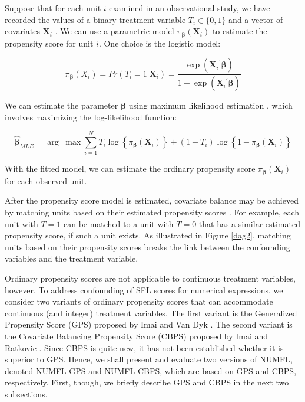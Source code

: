 Suppose that for each unit $i$ examined in an observational study, we have recorded the values of a binary treatment variable ${T_i} \in \{ 0,1\} $ and a vector of covariates ${\pmb{X}_i}$ .  We can use a parametric model ${\pi _{\pmb\beta} }({\pmb{X}_i})$ to estimate the propensity score for unit $i$.  One choice is the logistic model:

\begin{equation*}
{\pi _{\pmb\beta} }({X_i}) = Pr({T_i} = 1|{\pmb{X}_i}) = \frac{{\exp ({\pmb{X}_i}^\prime \pmb\beta )}}{{1 + \exp ({\pmb{X}_i}^\prime \pmb\beta )}}
\end{equation*}

We can estimate the parameter $\pmb\beta$ using maximum likelihood estimation \cite{Silvapulle1981}, which involves maximizing the log-likelihood function:

\begin{equation}\label{cp3:eq1}
{\pmb{\hat \beta} _{MLE}} = \arg \;\max \sum\limits_{i = 1}^N {{T_i}\log \left\{ {{\pi _{\pmb\beta} }({\pmb{X}_i})} \right\} + (1 - {T_i})} \log \left\{ {1 - {\pi _{\pmb\beta} }({\pmb{X}_i})} \right\}
\end{equation}

With the fitted model, we can estimate the ordinary propensity score  ${\pi _{\pmb\beta}}({\pmb{X}_i})$ for each observed unit.

After the propensity score model is estimated, covariate balance may be achieved by matching units based on their estimated propensity scores \cite{Rosenbaum1983}.  For example, each unit with $T=1$ can be matched to a unit with $T=0$ that has a similar estimated propensity score, if such a unit exists.  As illustrated in Figure \ref{dag2}, matching units based on their propensity scores breaks the link between the confounding variables and the treatment variable.

Ordinary propensity scores are not applicable to continuous treatment variables, however.  To address confounding of SFL scores for numerical expressions, we consider two variants of ordinary propensity scores that can accommodate continuous (and integer) treatment variables.  The first variant is the Generalized Propensity Score (GPS) proposed by Imai and Van Dyk \cite{Imai2004}.  The second variant is the Covariate Balancing Propensity Score (CBPS) proposed by Imai and Ratkovic \cite{Imai2014}.  Since CBPS is quite new, it has not been established whether it is superior to GPS.  Hence, we shall present and evaluate two versions of NUMFL, denoted NUMFL-GPS and NUMFL-CBPS, which are based on GPS and CBPS, respectively.  First, though, we briefly describe GPS and CBPS in the next two subsections.


